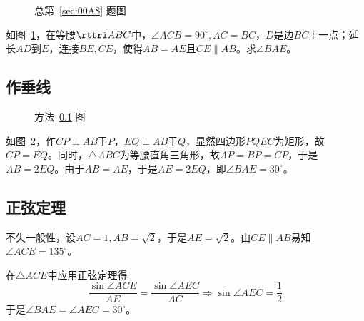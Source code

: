 

\begin{figure}[htbp]
  \centering {}
  \caption{总第~\ref{sec:00A8} 题图} \label{fig:00A8}
\end{figure}

如图~\ref{fig:00A8}，在等腰$\rttri ABC$中，$\angle ACB = 90^\circ, AC = BC$，$D$是边$BC$上一点；延长$AD$到$E$，连接$BE, CE$，使得$AB = AE$且$CE \parallel AB$。求$\angle BAE$。


\subsection{作垂线} \label{subsec:00A8-h}

\begin{figure}[htbp]
  \centering {}
  \caption{方法~\ref{subsec:00A8-h} 图} \label{fig:00A8-h}
\end{figure}

如图~\ref{fig:00A8-h}，作$CP \perp AB$于$P$，$EQ \perp AB$于$Q$，显然四边形$PQEC$为矩形，故$CP = EQ$。同时，$\triangle ABC$为等腰直角三角形，故$AP = BP = CP$，于是$AB = 2EQ$。由于$AB = AE$，于是$AE = 2EQ$，即$\angle BAE = 30^\circ$。

\subsection{正弦定理}

不失一般性，设$AC = 1, AB = \sqrt2$，于是$AE = \sqrt2$。由$CE \parallel AB$易知$\angle ACE = 135^\circ$。

在$\triangle ACE$中应用正弦定理得
\[ \frac{\sin\angle ACE}{AE} = \frac{\sin\angle AEC}{AC} \Rightarrow \sin\angle AEC = \frac12 \]
于是$\angle BAE = \angle AEC = 30^\circ$。
